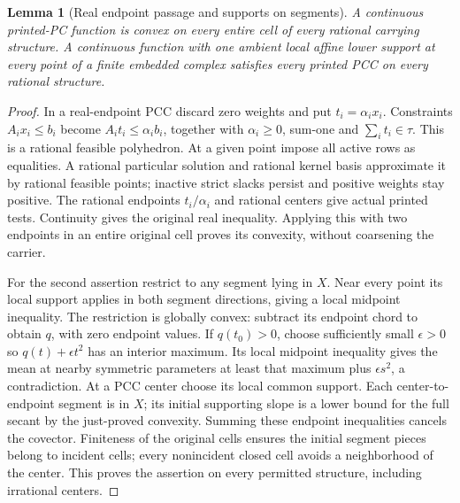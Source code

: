 \documentclass[11pt]{article}
\newtheorem{lemma}[theorem]{Lemma}
\begin{document}
\begin{lemma}[Real endpoint passage and supports on segments]\label{l:segments}
A continuous printed-PC function is convex on every entire cell of every rational carrying structure. A continuous function with one ambient local affine lower support at every point of a finite embedded complex satisfies every printed PCC on every rational structure.
\end{lemma}
\begin{proof}
In a real-endpoint PCC discard zero weights and put $t_i=\alpha_i x_i$. Constraints $A_i x_i\leq b_i$ become $A_i t_i\leq\alpha_i b_i$, together with $\alpha_i\geq0$, sum-one and $\sum_i t_i\in\tau$. This is a rational feasible polyhedron. At a given point impose all active rows as equalities. A rational particular solution and rational kernel basis approximate it by rational feasible points; inactive strict slacks persist and positive weights stay positive. The rational endpoints $t_i/\alpha_i$ and rational centers give actual printed tests. Continuity gives the original real inequality. Applying this with two endpoints in an entire original cell proves its convexity, without coarsening the carrier.

For the second assertion restrict to any segment lying in $X$. Near every point its local support applies in both segment directions, giving a local midpoint inequality. The restriction is globally convex: subtract its endpoint chord to obtain $q$, with zero endpoint values. If $q(t_0)>0$, choose sufficiently small $\epsilon>0$ so $q(t)+\epsilon t^2$ has an interior maximum. Its local midpoint inequality gives the mean at nearby symmetric parameters at least that maximum plus $\epsilon s^2$, a contradiction. At a PCC center choose its local common support. Each center-to-endpoint segment is in $X$; its initial supporting slope is a lower bound for the full secant by the just-proved convexity. Summing these endpoint inequalities cancels the covector. Finiteness of the original cells ensures the initial segment pieces belong to incident cells; every nonincident closed cell avoids a neighborhood of the center. This proves the assertion on every permitted structure, including irrational centers.
\end{proof}
\end{document}
